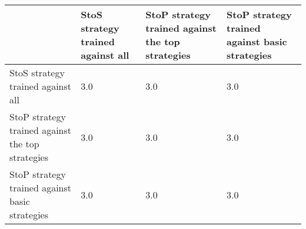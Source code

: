 \begin{tabular}{lp{}p{}p{}}
\toprule
{} &  StoS strategy trained against all &  StoP strategy trained against the top strategies &  StoP strategy trained against basic strategies \\
\midrule
StoS strategy trained against all                &                                3.0 &                                               3.0 &                                             3.0 \\
StoP strategy trained against the top strategies &                                3.0 &                                               3.0 &                                             3.0 \\
StoP strategy trained against basic strategies   &                                3.0 &                                               3.0 &                                             3.0 \\
\bottomrule
\end{tabular}
